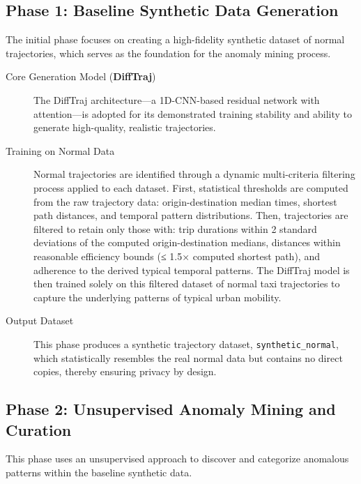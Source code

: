 \documentclass[runningheads]{llncs}
\begin{document}
\subsection{Phase 1: Baseline Synthetic Data Generation}
\label{sec:baseline-generation}

The initial phase focuses on creating a high-fidelity synthetic dataset of normal trajectories, which serves as the foundation for the anomaly mining process.

\begin{description}
    \item[Core Generation Model (\textbf{DiffTraj})] The DiffTraj architecture---a 1D-CNN-based residual network with attention---is adopted for its demonstrated training stability and ability to generate high-quality, realistic trajectories.
    \item[Training on Normal Data] Normal trajectories are identified through a dynamic multi-criteria filtering process applied to each dataset. First, statistical thresholds are computed from the raw trajectory data: origin-destination median times, shortest path distances, and temporal pattern distributions. Then, trajectories are filtered to retain only those with: trip durations within 2 standard deviations of the computed origin-destination medians, distances within reasonable efficiency bounds (≤ 1.5× computed shortest path), and adherence to the derived typical temporal patterns. The DiffTraj model is then trained solely on this filtered dataset of normal taxi trajectories to capture the underlying patterns of typical urban mobility.
    \item[Output Dataset] This phase produces a synthetic trajectory dataset, \texttt{synthetic\_normal}, which statistically resembles the real normal data but contains no direct copies, thereby ensuring privacy by design.
\end{description}

\subsection{Phase 2: Unsupervised Anomaly Mining and Curation}
\label{sec:anomaly-mining}

This phase uses an unsupervised approach to discover and categorize anomalous patterns within the baseline synthetic data.
\end{document}
